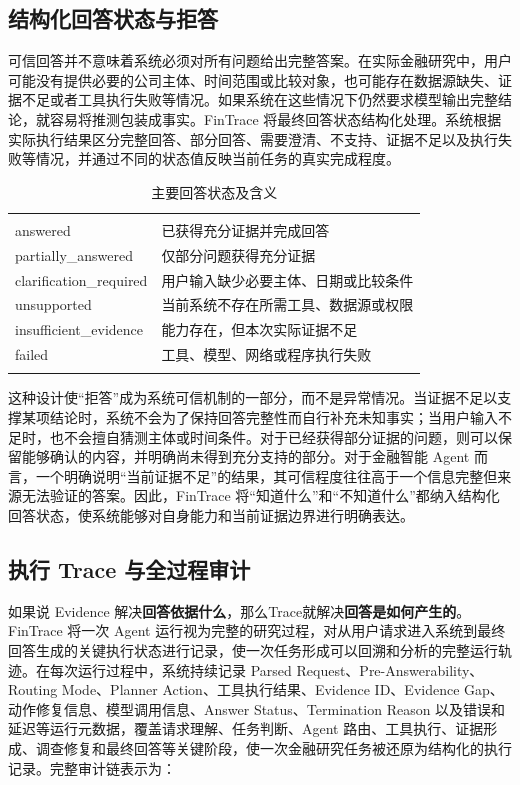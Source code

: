 \subsection{结构化回答状态与拒答}

可信回答并不意味着系统必须对所有问题给出完整答案。在实际金融研究中，用户可能没有提供必要的公司主体、时间范围或比较对象，也可能存在数据源缺失、证据不足或者工具执行失败等情况。如果系统在这些情况下仍然要求模型输出完整结论，就容易将推测包装成事实。FinTrace 将最终回答状态结构化处理。系统根据实际执行结果区分完整回答、部分回答、需要澄清、不支持、证据不足以及执行失败等情况，并通过不同的状态值反映当前任务的真实完成程度。

\begin{table}[htbp]
  \centering
  \caption{主要回答状态及含义}
  \label{tab:answer_status}
  \begin{tabular}{C{.23\textwidth}C{.67\textwidth}}
    \fintracetoprule
     &  \\
    \fintracemidrule
    answered & 已获得充分证据并完成回答 \\
    partially\_answered & 仅部分问题获得充分证据 \\
    clarification\_required & 用户输入缺少必要主体、日期或比较条件 \\
    unsupported & 当前系统不存在所需工具、数据源或权限 \\
    insufficient\_evidence & 能力存在，但本次实际证据不足 \\
    failed & 工具、模型、网络或程序执行失败 \\
    \fintracebottomrule
  \end{tabular}
\end{table}

这种设计使“拒答”成为系统可信机制的一部分，而不是异常情况。当证据不足以支撑某项结论时，系统不会为了保持回答完整性而自行补充未知事实；当用户输入不足时，也不会擅自猜测主体或时间条件。对于已经获得部分证据的问题，则可以保留能够确认的内容，并明确尚未得到充分支持的部分。对于金融智能 Agent 而言，一个明确说明“当前证据不足”的结果，其可信程度往往高于一个信息完整但来源无法验证的答案。因此，FinTrace 将“知道什么”和“不知道什么”都纳入结构化回答状态，使系统能够对自身能力和当前证据边界进行明确表达。

\subsection{执行 Trace 与全过程审计}

如果说 Evidence 解决\textbf{回答依据什么}，那么Trace就解决\textbf{回答是如何产生的}。FinTrace 将一次 Agent 运行视为完整的研究过程，对从用户请求进入系统到最终回答生成的关键执行状态进行记录，使一次任务形成可以回溯和分析的完整运行轨迹。在每次运行过程中，系统持续记录 Parsed Request、Pre-Answerability、Routing Mode、Planner Action、工具执行结果、Evidence ID、Evidence Gap、动作修复信息、模型调用信息、Answer Status、Termination Reason 以及错误和延迟等运行元数据，覆盖请求理解、任务判断、Agent 路由、工具执行、证据形成、调查修复和最终回答等关键阶段，使一次金融研究任务被还原为结构化的执行记录。完整审计链表示为：


